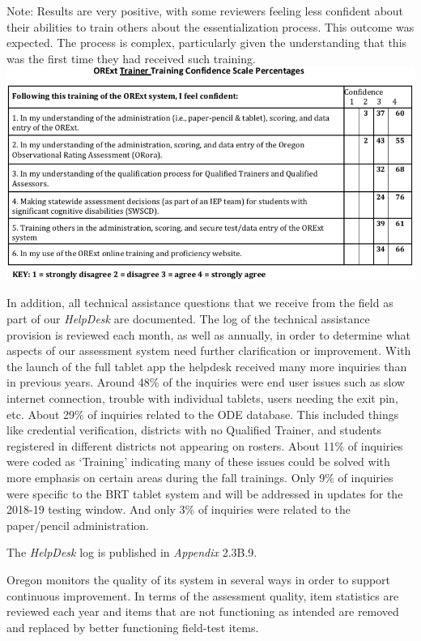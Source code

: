 \documentclass[]{article}
\begin{document}
Note: Results are very positive, with some reviewers feeling less
confident about their abilities to train others about the
essentialization process. This outcome was expected. The process is
complex, particularly given the understanding that this was the first
time they had received such training. \FloatBarrier
\includegraphics{Figures/QTQAtraining/TrainingConfidenceScale.png}

In addition, all technical assistance questions that we receive from the
field as part of our \emph{HelpDesk} are documented. The log of the
technical assistance provision is reviewed each month, as well as
annually, in order to determine what aspects of our assessment system
need further clarification or improvement. With the launch of the full
tablet app the helpdesk received many more inquiries than in previous
years. Around 48\% of the inquiries were end user issues such as slow
internet connection, trouble with individual tablets, users needing the
exit pin, etc. About 29\% of inquiries related to the ODE database. This
included things like credential verification, districts with no
Qualified Trainer, and students registered in different districts not
appearing on rosters. About 11\% of inquiries were coded as `Training'
indicating many of these issues could be solved with more emphasis on
certain areas during the fall trainings. Only 9\% of inquiries were
specific to the BRT tablet system and will be addressed in updates for
the 2018-19 testing window. And only 3\% of inquiries were related to
the paper/pencil administration.

The \emph{HelpDesk} log is published in \emph{Appendix} 2.3B.9.

Oregon monitors the quality of its system in several ways in order to
support continuous improvement. In terms of the assessment quality, item
statistics are reviewed each year and items that are not functioning as
intended are removed and replaced by better functioning field-test
items.
\end{document}
